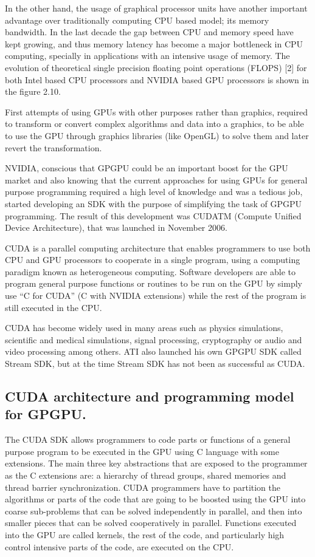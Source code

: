 \documentclass[thesis=M,english]{FITthesis}[2011/07/15]
\begin{document}
In the other hand, the usage of graphical processor units have another important advantage over traditionally computing CPU based model; its memory bandwidth. In the last decade the gap between CPU and memory speed have kept growing, and thus memory latency has become a major bottleneck in CPU computing, specially in applications with an intensive usage of memory. The evolution of theoretical single precision floating point operations (FLOPS) [2] for both Intel based CPU processors and NVIDIA based GPU processors is shown in the figure 2.10. 

First attempts of using GPUs with other purposes rather than graphics, required to transform or convert complex algorithms and data into a graphics, to be able to use the GPU through graphics libraries (like OpenGL) to solve them and later revert the transformation. 

NVIDIA, conscious that GPGPU could be an important boost for the GPU market and also knowing that the current approaches for using GPUs for general purpose programming required a high level of knowledge and was a tedious job, started developing an SDK with the purpose of simplifying the task of GPGPU programming. The result of this development was CUDATM (Compute Unified Device Architecture), that was launched in November 2006. 

CUDA is a parallel computing architecture that enables programmers to use both CPU and GPU processors to cooperate in a single program, using a computing paradigm known as heterogeneous computing. Software developers are able to program general purpose functions or routines to be run on the GPU by simply use “C for CUDA” (C with NVIDIA extensions) while the rest of the program is still executed in the CPU. 

CUDA has become widely used in many areas such as physics simulations, scientific and medical simulations, signal processing, cryptography or audio and video processing among others. ATI also launched his own GPGPU SDK called Stream SDK, but at the time Stream SDK has not been as successful as CUDA.

\subsection{CUDA architecture and programming model for GPGPU.}

The CUDA SDK allows programmers to code parts or functions of a general purpose program to be executed in the GPU using C language with some extensions. The main three key abstractions that are exposed to the programmer as the C extensions are: a hierarchy of thread groups, shared memories and thread barrier synchronization. CUDA programmers have to partition the algorithms or parts of the code that are going to be boosted using the GPU into coarse sub-problems that can be solved independently in parallel, and then into smaller pieces that can be solved cooperatively in parallel. Functions executed into the GPU are called kernels, the rest of the code, and particularly
high control intensive parts of the code, are executed on the CPU. 
\end{document}
